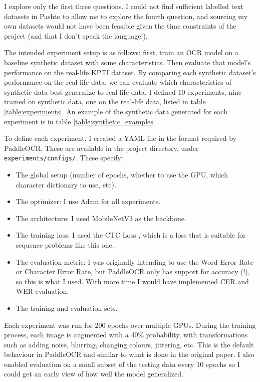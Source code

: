 \documentclass[twocolumn,11pt]{extarticle}
\begin{document}
I explore only the first three questions. I could not find sufficient labelled text datasets in Pashto to allow me to explore the fourth question, and sourcing my own datasets would not have been feasible given the time constraints of the project (and that I don't speak the language!). 

The intended experiment setup is as follows: first, train an OCR model on a baseline synthetic dataset with some characteristics. Then evaluate that model's performance on the real-life KPTI dataset. By comparing each synthetic dataset's performance on the real-life data, we can evaluate which characteristics of synthetic data best generalize to real-life data. I defined 10 experiments, nine trained on synthetic data, one on the real-life data, listed in table \ref{table:experiments}. An example of the synthetic data generated for each experiment is in table \ref{table:synthetic_examples}. 

To define each experiment, I created a YAML file in the format required by PaddleOCR. These are available in the project directory, under \verb|experiments/configs/|. These specify:
\begin{itemize}
    \item The global setup (number of epochs, whether to use the GPU, which character dictionary to use, etc).
    \item The optimizer: I use Adam \cite{kingma_adam_2017} for all experiments. 
    \item The architecture: I used MobileNetV3 as the backbone. 
    \item The training loss: I used the CTC Loss \cite{graves_connectionist_2006}, which is a loss that is suitable for sequence problems like this one.
    \item The evaluation metric: I was originally intending to use the Word Error Rate or Character Error Rate, but PaddleOCR only has support for accuracy (!), so this is what I used. With more time I would have implemented CER and WER evaluation.
    \item The training and evaluation sets. 
\end{itemize}

Each experiment was run for 200 epochs over multiple GPUs. During the training process, each image is augmented with a 40\% probability, with transformations such as adding noise, blurring, changing colours, jittering, etc. This is the default behaviour in PaddleOCR and similar to what is done in the original paper. I also enabled evaluation on a small subset of the testing data every 10 epochs so I could get an early view of how well the model generalized. 
\end{document}
